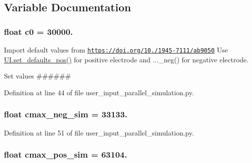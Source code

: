 \subsection{Variable Documentation}
\hypertarget{namespaceuser__input__parallel__simulation_aa3407022b348cd058d9808eed482ab4a}{
\subsubsection[{c0}]{\setlength{\rightskip}{0pt plus 5cm}float c0 = 30000.}}\label{namespaceuser__input__parallel__simulation_aa3407022b348cd058d9808eed482ab4a}


Import default values from \href{https://doi.org/10.1149/1945-7111/ab9050}{\tt https\-://doi.\-org/10./1945-\/7111/ab9050} Use \hyperlink{namespaceuser__input__mod_acef497295190e3914f7cd93da2708856}{U\-I.\-set\-\_\-defaults\-\_\-pos()} for positive electrode and ...\-\_\-neg() for negative electrode. 

Set values \#\#\#\#\#\# 

Definition at line 44 of file user\-\_\-input\-\_\-parallel\-\_\-simulation.\-py.

\hypertarget{namespaceuser__input__parallel__simulation_ab7633a5e9c70aabfe6992e4fe521a1f9}{
\subsubsection[{cmax\-\_\-neg\-\_\-sim}]{\setlength{\rightskip}{0pt plus 5cm}float cmax\-\_\-neg\-\_\-sim = 33133.}}\label{namespaceuser__input__parallel__simulation_ab7633a5e9c70aabfe6992e4fe521a1f9}


Definition at line 51 of file user\-\_\-input\-\_\-parallel\-\_\-simulation.\-py.

\hypertarget{namespaceuser__input__parallel__simulation_aa5b015cc7d0bda453c6163023448db72}{
\subsubsection[{cmax\-\_\-pos\-\_\-sim}]{\setlength{\rightskip}{0pt plus 5cm}float cmax\-\_\-pos\-\_\-sim = 63104.}}\label{namespaceuser__input__parallel__simulation_aa5b015cc7d0bda453c6163023448db72}


